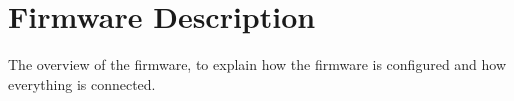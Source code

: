 \chapter{Firmware Description}
The overview of the firmware, to explain how the firmware is configured and how everything is connected. 
\label{chapter:more_results}